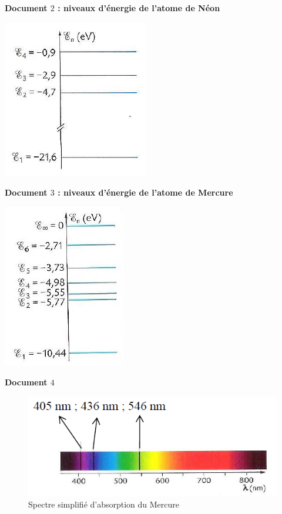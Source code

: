 \begin{minipage}[c]{.46\linewidth}
\textbf{Document $2$ : niveaux d'énergie de l'atome de Néon}
\begin{center}
\includegraphics[width=0.5\columnwidth]{images/Exo3_Diagramme_Niveaux_Energie_Neon}
\end{center}
\end{minipage}
\begin{minipage}[c]{.46\linewidth}
\textbf{Document $3$ : niveaux d'énergie de l'atome de Mercure}
\begin{center}
\includegraphics[width=0.4\columnwidth]{images/Exo3_Diagramme_Niveaux_Energie_Mercure}
\end{center}
\end{minipage}

\vspace{0.3cm}

\textbf{Document $4$}

\begin{figure}[h]
\begin{center}
\includegraphics[width=0.75\columnwidth]{images/Exo3_Spectre_Absorption_Mercure}
\end{center}
\caption{\label{fig:Spectre_Absorption_Mercure}
Spectre simplifié d'absorption du Mercure}
\end{figure}

